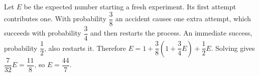 Let $E$ be the expected number starting a fresh experiment. Its first attempt contributes one. With probability $\dfrac{3}{8}$ an accident causes one extra attempt, which succeeds with probability $\dfrac{3}{4}$ and then restarts the process. An immediate success, probability $\dfrac{1}{2}$, also restarts it. Therefore $E=1+\dfrac{3}{8}(1+\dfrac{3}{4}E)+\dfrac{1}{2}E$. Solving gives $\dfrac{7}{32}E=\dfrac{11}{8}$, so $\boxed{E=\dfrac{44}{7}}$.
